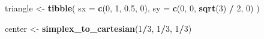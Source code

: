 \documentclass[
]{article}
\newenvironment{Shaded}{\begin{snugshade}}{\end{snugshade}}
\newcommand{\AttributeTok}[1]{\textcolor[rgb]{0.13,0.29,0.53}{#1}}
\newcommand{\DecValTok}[1]{\textcolor[rgb]{0.00,0.00,0.81}{#1}}
\newcommand{\FloatTok}[1]{\textcolor[rgb]{0.00,0.00,0.81}{#1}}
\newcommand{\FunctionTok}[1]{\textcolor[rgb]{0.13,0.29,0.53}{\textbf{#1}}}
\newcommand{\NormalTok}[1]{#1}
\newcommand{\OtherTok}[1]{\textcolor[rgb]{0.56,0.35,0.01}{#1}}
\newcommand{\SpecialCharTok}[1]{\textcolor[rgb]{0.81,0.36,0.00}{\textbf{#1}}}
\begin{document}
\begin{Shaded}
\begin{Highlighting}[]
\NormalTok{triangle }\OtherTok{\textless{}{-}} \FunctionTok{tibble}\NormalTok{(}
  \AttributeTok{sx =} \FunctionTok{c}\NormalTok{(}\DecValTok{0}\NormalTok{, }\DecValTok{1}\NormalTok{, }\FloatTok{0.5}\NormalTok{, }\DecValTok{0}\NormalTok{),}
  \AttributeTok{sy =} \FunctionTok{c}\NormalTok{(}\DecValTok{0}\NormalTok{, }\DecValTok{0}\NormalTok{, }\FunctionTok{sqrt}\NormalTok{(}\DecValTok{3}\NormalTok{) }\SpecialCharTok{/} \DecValTok{2}\NormalTok{, }\DecValTok{0}\NormalTok{)}
\NormalTok{)}

\NormalTok{center }\OtherTok{\textless{}{-}} \FunctionTok{simplex\_to\_cartesian}\NormalTok{(}\DecValTok{1}\SpecialCharTok{/}\DecValTok{3}\NormalTok{, }\DecValTok{1}\SpecialCharTok{/}\DecValTok{3}\NormalTok{, }\DecValTok{1}\SpecialCharTok{/}\DecValTok{3}\NormalTok{)}


\end{Highlighting}
\end{Shaded}
\end{document}
